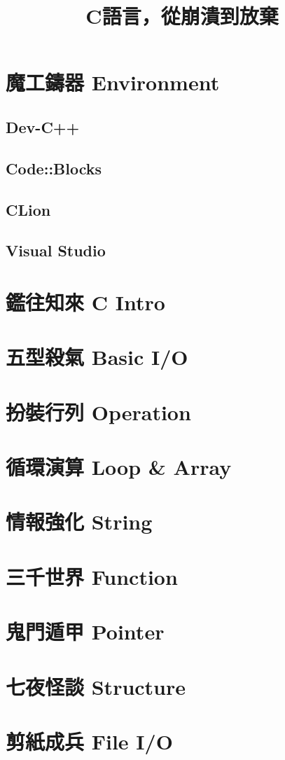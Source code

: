 \documentclass[12pt,a4paper]{book}
\title{C語言，從崩潰到放棄}
\begin{document}
\chapter{魔工鑄器 Environment}
\section{Dev-C++}
\section{Code::Blocks}
\section{CLion}
\section{Visual Studio}

\chapter{鑑往知來 C Intro}

\chapter{五型殺氣 Basic I/O}

\chapter{扮裝行列 Operation}

\chapter{循環演算 Loop \& Array}

\chapter{情報強化 String}

\chapter{三千世界 Function}

\chapter{鬼門遁甲 Pointer}

\chapter{七夜怪談 Structure}

\chapter{剪紙成兵 File I/O}
\end{document}
